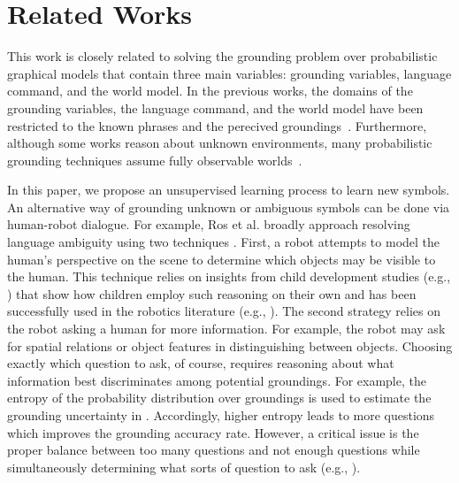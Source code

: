 \section{Related Works}
\label{sec:related}
This work is closely related to solving the grounding problem over probabilistic graphical models that contain three main variables: grounding variables, language command, and the world model.
In the previous works, the domains of the grounding variables, the language command, and the world model have been restricted to the known phrases and the perecived groundings~\cite{g3,dcg}.
Furthermore, although some works reason about unknown environments, many probabilistic grounding techniques assume fully observable worlds~\cite{citeLangNoisySensor,outside1}.

In this paper, we propose an unsupervised learning process to learn new symbols. An alternative way of grounding unknown or ambiguous symbols can be done via human-robot dialogue. For example, Ros et al. broadly approach resolving language ambiguity using two techniques \cite{whichOne}. First, a robot attempts to model the human's perspective on the scene to determine which objects may be visible to the human.
This technique relies on insights from child development studies (e.g., \cite{kids1}) that show how children employ such reasoning on their own and has been successfully used in the robotics literature (e.g., \cite{perspective1,perspective2}).
The second strategy relies on the robot asking a human for more information.
For example, the robot may ask for spatial relations or object features in distinguishing between objects.
Choosing exactly which question to ask, of course, requires reasoning about what information best discriminates among potential groundings. %
For example, the entropy of the probability distribution over groundings is used to estimate the grounding uncertainty in \cite{clarifyingCommands}. Accordingly, higher entropy leads to more questions which improves the grounding accuracy rate.
However, a critical issue is the proper balance between too many questions and not enough questions while simultaneously determining what sorts of question to ask (e.g., \cite{interaction1,interaction2}).

